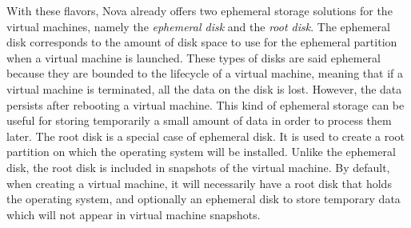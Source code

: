 
With these flavors, Nova already offers two ephemeral storage solutions for the virtual machines, namely the \textit{ephemeral disk} and the \textit{root disk}.
The ephemeral disk corresponds to the amount of disk space to use for the ephemeral partition when a virtual machine is launched. 
These types of disks are said ephemeral because they are bounded to the lifecycle of a virtual machine, meaning that if a virtual machine is terminated, all the data on the disk is lost. 
However, the data persists after rebooting a virtual machine.
This kind of ephemeral storage can be useful for storing temporarily a small amount of data in order to process them later.
The root disk is a special case of ephemeral disk. 
It is used to create a root partition on which the operating system will be installed.
Unlike the ephemeral disk, the root disk is included in snapshots of the virtual machine. 
By default, when creating a virtual machine, it will necessarily have a root disk that holds the operating system, and optionally an ephemeral disk to store temporary data which will not appear in virtual machine snapshots.



